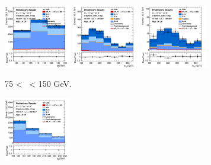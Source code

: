 \begin{figure}[h!]
    \centering
    \begin{subfigure}[b]{\textwidth}
        \centering
        \includegraphics[width=0.32\textwidth]{Images/VH/Own_fit/postfit_VHcc/Region_distpTV_BMax150_BMin75_DCRHigh_J2_TTypent_T1_L2_Y6051_GlobalFit_conditionnal_mu1.png}
        \includegraphics[width=0.32\textwidth]{Images/VH/Own_fit/postfit_VHcc/Region_distmBB_BMax150_BMin75_DCRHigh_J2_TTypelt_T2_L2_Y6051_GlobalFit_conditionnal_mu1.png}
        \includegraphics[width=0.32\textwidth]{Images/VH/Own_fit/postfit_VHcc/Region_distmBB_BMax150_BMin75_DCRHigh_J2_TTypett_T2_L2_Y6051_GlobalFit_conditionnal_mu1.png}
        \caption{75 < \ptv\ < 150 GeV.}
        \label{fig:plots_VHcc_2L_75_CRH_2J}
    \end{subfigure}
    \begin{subfigure}[b]{\textwidth}
        \centering
        \includegraphics[width=0.32\textwidth]{Images/VH/Own_fit/postfit_VHcc/Region_distpTV_BMax250_BMin150_DCRHigh_J2_TTypent_T1_L2_Y6051_GlobalFit_conditionnal_mu1.png}

\end{subfigure}
\end{figure}
